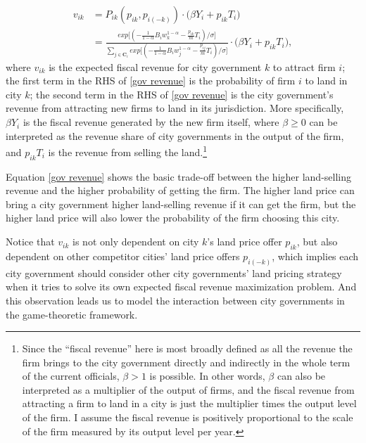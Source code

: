 \begin{align}
    v_{ik} & = P_{ik}(p_{ik}, p_{i(-k)})
    \cdot \big(\beta Y_i + p_{ik}T_i\big)   \nonumber                \\
           & = \frac{exp\big[(-\frac{1}{1-\alpha} B_i w_k^{1-\alpha}
    - \frac{p_{ik}}{m}T_i)/\sigma\big]}
    {\sum_{j\in \mathbf{C}_i} exp\big[(-\frac{1}{1-\alpha} B_i w_j^{1-\alpha}
    - \frac{p_{ij}}{m} T_i)/\sigma\big]}
    \cdot \big(\beta Y_i + p_{ik}T_i\big),
    \label{gov revenue}
\end{align}
where $v_{ik}$ is the expected fiscal revenue for city government $k$ to attract firm $i$;
the first term in the RHS of \eqref{gov revenue} is the probability of firm $i$ to land in
city $k$;
the second term in the RHS of \eqref{gov revenue} is
the city government's revenue from attracting new firms to land in its jurisdiction.
More specifically, $\beta Y_i$ is the fiscal revenue generated by the new firm itself,
where $\beta \geq 0$
can be interpreted as the revenue share of city governments in the output of the firm,
and $p_{ik}T_i$ is the revenue from selling the land.\footnote{
    Since the ``fiscal revenue'' here is most broadly defined as all the revenue
    the firm  brings to the city government directly and indirectly
    in the whole term of the current officials, $\beta > 1$ is possible.
    In other words, $\beta$ can also be interpreted as a multiplier of the output of firms,
    and the fiscal revenue from attracting a firm to land in a city is just the multiplier
    times the output level of the firm.
    I assume the fiscal revenue is positively proportional to the scale
    of the firm measured by its output level per year.}

Equation \eqref{gov revenue} shows the basic trade-off between the higher land-selling revenue and
the higher probability of getting the firm. The higher land price can bring a city government higher
land-selling revenue if it can get the firm, but the higher land price will also
lower the probability of the firm choosing this city.

Notice that $v_{ik}$ is not only dependent on city $k$'s land price offer $p_{ik}$, but also
dependent on other competitor cities' land price offers $p_{i(-k)}$, which implies
each city government should consider other city governments' land pricing strategy
when it tries to solve its own expected fiscal revenue maximization problem.
And this observation leads us to model the interaction between city governments
in the game-theoretic framework.

